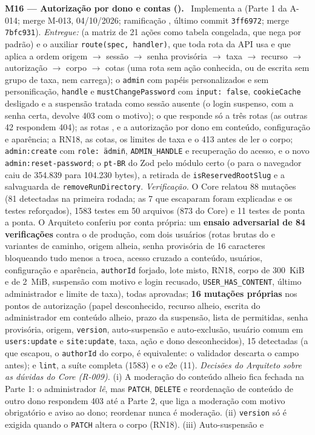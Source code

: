 \textbf{M16 --- Autorização por dono e contas ().} \ Implementa a  (Parte 1 da A-014; merge M-013, 04/10/2026; ramificação , último commit \texttt{3ff6972}; merge \texttt{7bfc931}). \emph{Entregue:}  (a matriz de 21 ações como tabela congelada, que nega por padrão) e o auxiliar \texttt{route(spec, handler)}, que toda rota da API usa e que aplica a ordem origem $\rightarrow$ sessão $\rightarrow$ senha provisória $\rightarrow$ taxa $\rightarrow$ recurso $\rightarrow$ autorização $\rightarrow$ corpo $\rightarrow$ cotas (uma rota sem ação conhecida, ou de escrita sem grupo de taxa, nem carrega); o  \texttt{admin} com papéis personalizados e sem personificação, \texttt{handle} e \texttt{mustChangePassword} com \texttt{input: false}, \texttt{cookieCache} desligado e a suspensão tratada como sessão ausente (o login suspenso, com a senha certa, devolve 403  com o motivo); o  que responde só a três rotas (as outras 42 respondem 404); as rotas ,  e a autorização por dono em conteúdo, configuração e aparência; a RN18, as cotas, os limites de taxa e o 413 antes de ler o corpo; \texttt{admin:create} com \texttt{role: \"admin\"}, \texttt{ADMIN\_HANDLE} e recuperação do acesso, e o novo \texttt{admin:reset-password}; o \texttt{pt-BR} do Zod pelo módulo certo (o  para o navegador caiu de 354.839 para 104.230 bytes), a retirada de \texttt{isReservedRootSlug} e a salvaguarda de \texttt{removeRunDirectory}. \emph{Verificação.} O Core relatou 88 mutações (81 detectadas na primeira rodada; as 7 que escaparam foram explicadas e os testes reforçados), 1583 testes em 50 arquivos (873 do Core) e 11 testes de ponta a ponta. O Arquiteto conferiu por conta própria: um \textbf{ensaio adversarial de 84 verificações} contra o  de produção, com dois usuários (rotas brutas do  e variantes de caminho, origem alheia, senha provisória de 16 caracteres bloqueando tudo menos a troca, acesso cruzado a conteúdo, usuários, configuração e aparência, \texttt{authorId} forjado, lote misto, RN18, corpo de 300~KiB e de 2~MiB, suspensão com motivo e login recusado, \texttt{USER\_HAS\_CONTENT}, último administrador e limite de taxa), todas aprovadas; \textbf{16 mutações próprias} nos pontos de autorização (papel desconhecido, recurso alheio, escrita do administrador em conteúdo alheio, prazo da suspensão, lista de permitidas, senha provisória, origem, \texttt{version}, auto-suspensão e auto-exclusão, usuário comum em \texttt{users:update} e \texttt{site:update}, taxa, ação e dono desconhecidos), 15 detectadas (a que escapou, o \texttt{authorId} do corpo, é equivalente: o validador descarta o campo antes); e \texttt{lint}, a suíte completa (1583) e o e2e (11). \emph{Decisões do Arquiteto sobre as dúvidas do Core (R-009).} (i) A moderação do conteúdo alheio fica fechada na Parte 1: o administrador \emph{lê}, mas \texttt{PATCH}, \texttt{DELETE} e reordenação de conteúdo de outro dono respondem 403 até a Parte 2, que liga a moderação com motivo obrigatório e aviso ao dono; reordenar nunca é moderação. (ii) \texttt{version} só é exigida quando o \texttt{PATCH} altera o corpo (RN18). (iii) Auto-suspensão e 